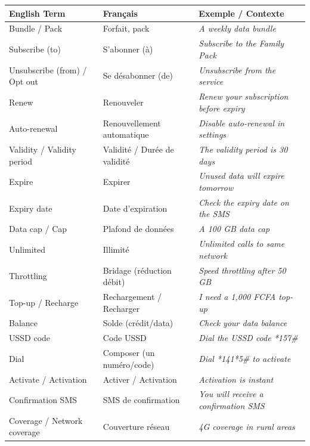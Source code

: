 \documentclass[11pt]{article}
\newcommand{\cle}[1]{{\popxbold\color{popdark}#1}}
\newcommand{\eng}[1]{\ifmmode\text{\textit{#1}}\else\begingroup\selectlanguage{english}\itshape #1\endgroup\fi}
\begin{document}
\begin{aretenir}
\begin{center}
\begin{tabularx}{\linewidth}{|X|X|X|}\hline
\rowcolor{popblueL} \textbf{English Term} & \textbf{Français} & \textbf{Exemple / Contexte} \\ \hline
\cle{Bundle} / \cle{Pack} & Forfait, pack & \eng{A weekly data bundle} \\ \hline
\cle{Subscribe (to)} & S'abonner (à) & \eng{Subscribe to the Family Pack} \\ \hline
\cle{Unsubscribe (from)} / \cle{Opt out} & Se désabonner (de) & \eng{Unsubscribe from the service} \\ \hline
\cle{Renew} & Renouveler & \eng{Renew your subscription before expiry} \\ \hline
\cle{Auto-renewal} & Renouvellement automatique & \eng{Disable auto-renewal in settings} \\ \hline
\cle{Validity} / \cle{Validity period} & Validité / Durée de validité & \eng{The validity period is 30 days} \\ \hline
\cle{Expire} & Expirer & \eng{Unused data will expire tomorrow} \\ \hline
\cle{Expiry date} & Date d'expiration & \eng{Check the expiry date on the SMS} \\ \hline
\cle{Data cap} / \cle{Cap} & Plafond de données & \eng{A 100 GB data cap} \\ \hline
\cle{Unlimited} & Illimité & \eng{Unlimited calls to same network} \\ \hline
\cle{Throttling} & Bridage (réduction débit) & \eng{Speed throttling after 50 GB} \\ \hline
\cle{Top-up} / \cle{Recharge} & Rechargement / Recharger & \eng{I need a 1,000 FCFA top-up} \\ \hline
\cle{Balance} & Solde (crédit/data) & \eng{Check your data balance} \\ \hline
\cle{USSD code} & Code USSD & \eng{Dial the USSD code *157\#} \\ \hline
\cle{Dial} & Composer (un numéro/code) & \eng{Dial *141*5\# to activate} \\ \hline
\cle{Activate} / \cle{Activation} & Activer / Activation & \eng{Activation is instant} \\ \hline
\cle{Confirmation SMS} & SMS de confirmation & \eng{You will receive a confirmation SMS} \\ \hline
\cle{Coverage} / \cle{Network coverage} & Couverture réseau & \eng{4G coverage in rural areas} \\ \hline

\end{tabularx}
\end{center}
\end{aretenir}
\end{document}
